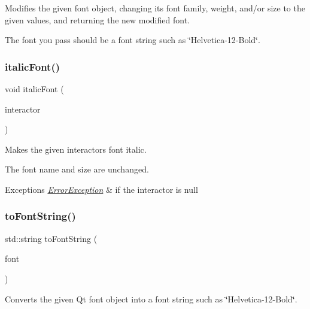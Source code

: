 Modifies the given font object, changing its font family, weight, and/or size to the given values, and returning the new modified font. 

The font you pass should be a font string such as \char`\"{}\+Helvetica-\/12-\/\+Bold\char`\"{}. \mbox{\label{classGFont_a3f37291f3e288376754c056a10b64f90}} 
\subsubsection{\texorpdfstring{italic\+Font()}{italicFont()}}
{\footnotesize\ttfamily void italic\+Font (\begin{DoxyParamCaption}\item[{\mbox{\hyperlink{classGInteractor}{G\+Interactor}} $\ast$}]{interactor }\end{DoxyParamCaption})\hspace{0.3cm}{\ttfamily [static]}}



Makes the given interactor\textquotesingle{}s font italic. 

The font name and size are unchanged. 
\begin{DoxyExceptions}{Exceptions}
{\em \mbox{\hyperlink{classErrorException}{Error\+Exception}}} & if the interactor is null \\
\hline
\end{DoxyExceptions}
\mbox{\label{classGFont_a1e897239fcf0fa78a33f3021a98b0029}} 
\subsubsection{\texorpdfstring{to\+Font\+String()}{toFontString()}}
{\footnotesize\ttfamily std\+::string to\+Font\+String (\begin{DoxyParamCaption}\item[{const Q\+Font \&}]{font }\end{DoxyParamCaption})\hspace{0.3cm}{\ttfamily [static]}}



Converts the given Qt font object into a font string such as \char`\"{}\+Helvetica-\/12-\/\+Bold\char`\"{}. 

